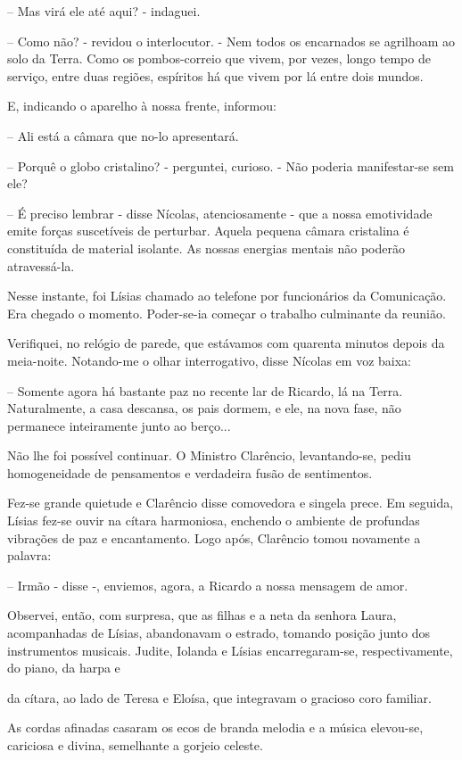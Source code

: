 \documentclass[portuguese,12pt,a4paper]{scrbook}
\begin{document}
	– Mas virá ele até aqui? - indaguei.
	
	– Como não? - revidou o interlocutor. - Nem todos os encarnados se agrilhoam ao solo da Terra. Como os pombos-correio que vivem, por vezes, longo tempo de serviço, entre duas regiões, espíritos há que vivem por lá entre dois mundos.
	
	
	E, indicando o aparelho à nossa frente, informou:
	
	– Ali está a câmara que no-lo apresentará.
	
	– Porquê o globo cristalino? - perguntei, curioso. - Não poderia manifestar-se sem ele?
	
	– É preciso lembrar - disse Nícolas, atenciosamente - que a nossa emotividade emite forças suscetíveis de perturbar. Aquela pequena câmara cristalina é constituída de material isolante. As nossas energias mentais não poderão atravessá-la.
	
	Nesse instante, foi Lísias chamado ao telefone por funcionários da Comunicação. Era chegado o momento. Poder-se-ia começar o trabalho culminante da reunião.
	
	Verifiquei, no relógio de parede, que estávamos com quarenta minutos depois da meia-noite. Notando-me o olhar interrogativo, disse Nícolas em voz baixa:
	
	– Somente agora há bastante paz no recente lar de Ricardo, lá na Terra. Naturalmente, a casa descansa, os pais dormem, e ele, na nova fase, não permanece inteiramente junto ao berço...
	
	Não lhe foi possível continuar. O Ministro Clarêncio, levantando-se, pediu homogeneidade de pensamentos e verdadeira fusão de sentimentos.
	
	Fez-se grande quietude e Clarêncio disse comovedora e singela prece. Em seguida, Lísias fez-se ouvir na cítara harmoniosa, enchendo o ambiente de profundas vibrações de paz e encantamento. Logo após, Clarêncio tomou novamente a palavra:
	
	– Irmão - disse -, enviemos, agora, a Ricardo a nossa mensagem de amor.
	
	Observei, então, com surpresa, que as filhas e a neta da senhora Laura, acompanhadas de Lísias, abandonavam o estrado, tomando posição junto dos instrumentos musicais. Judite, Iolanda e Lísias encarregaram-se, respectivamente, do piano, da harpa e
	
	
	da cítara, ao lado de Teresa e Eloísa, que integravam o gracioso coro familiar.
	
	As cordas afinadas casaram os ecos de branda melodia e a música elevou-se, cariciosa e divina, semelhante a gorjeio celeste.
	
\end{document}
